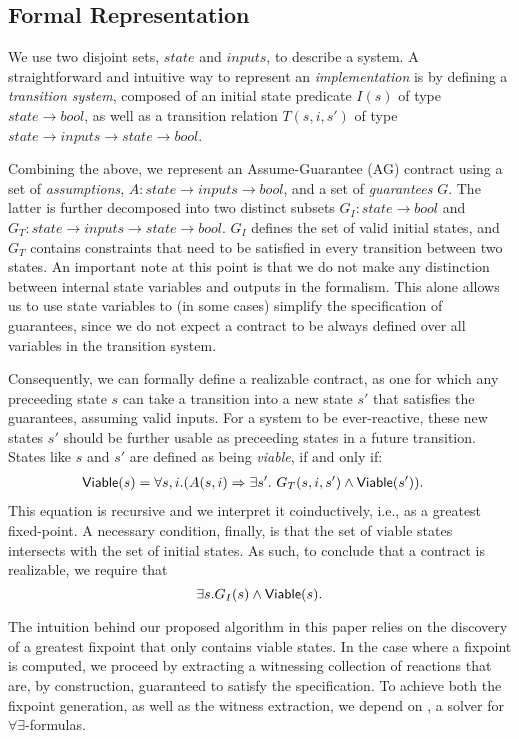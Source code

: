 \subsection{Formal Representation}
\label{sec:formals}
We use two disjoint sets, $state$ and $inputs$, to describe a system.
A straightforward and intuitive way to represent an \emph{implementation} is by
defining a \emph{transition system}, composed of an initial state
predicate $I(s)$ of type $state \to bool$, as well as a transition relation
$T(s,i,s')$ of type $state \to inputs \to state \to bool$.

Combining the above, we represent an Assume-Guarantee (AG) contract using a set
of \emph{assumptions}, $A: state \rightarrow inputs \rightarrow bool$,
and a set of \emph{guarantees} $G$. The latter is further decomposed into two
distinct subsets $G_I: state \rightarrow bool$ and $G_T: state \rightarrow
inputs \rightarrow state \rightarrow bool$. $G_I$ defines the set of valid
initial states, and $G_T$ contains constraints that need to be satisfied in
every transition between two states. An important note at this point is that we
do not make any distinction between internal state variables and outputs in the
formalism. This alone allows us to use state variables to (in some cases)
simplify the specification of guarantees, since we do not expect a contract
to be always defined over all variables in the transition system.

Consequently, we can formally define a realizable contract, as one for which any
preceeding state $s$ can take a transition into a new state $s'$ that satisfies
the guarantees, assuming valid inputs. For a system to be ever-reactive, these
new states $s'$ should be further usable as preceeding states in a future
transition. States like $s$ and $s'$ are defined as being \textit{viable}, if
and only if:
\begin{align}
\begin{split}
  {\mathsf {Viable}}(s) &=
  \forall s,i. (A(s, i) \Rightarrow \exists s'.~ G_T(s, i,s')
\land {\mathsf {Viable}}(s')).
\label{eq:viable}
\end{split}
\end{align}
This equation is recursive and we interpret it coinductively, i.e., as a
greatest fixed-point.
A necessary condition, finally, is that the set of viable states
intersects with the set of initial states. As such, to conclude that a contract
is realizable, we require that
\begin{equation}
\exists s. G_I(s) \land {\mathsf {Viable}}(s).
\label{eq:nonempty}
\end{equation}

The intuition behind our proposed algorithm in this paper relies on the
discovery of a greatest fixpoint that only contains viable states. In the case where a fixpoint is computed, we proceed by extracting a witnessing collection of reactions that are, by construction, guaranteed to satisfy the specification. To achieve both the fixpoint generation, as well as the witness extraction, we depend on \aeval, a solver for $\forall\exists$-formulas.


